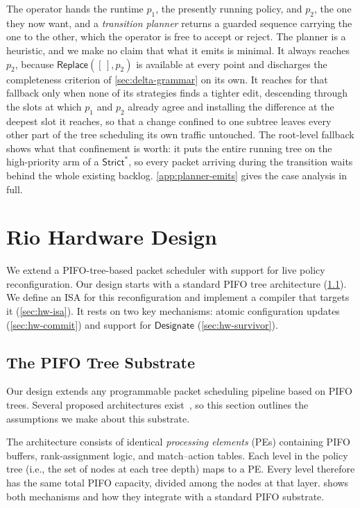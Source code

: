 \documentclass[sigplan,anonymous,review,nonacm]{acmart}
\newcommand{\Strictstar}{\textsf{Strict}^{*}}
\newcommand{\Designate}{\textsf{Designate}}
\newcommand{\Replace}{\textsf{Replace}}
\begin{document}
The operator hands the runtime \(p_1\), the presently running policy, and \(p_2\), the one they now want, and a \emph{transition planner} returns a guarded sequence carrying the one to the other, which the operator is free to accept or reject.
The planner is a heuristic, and we make no claim that what it emits is minimal.
It always reaches \(p_2\), because \(\Replace([\,], p_2)\) is available at every point and discharges the completeness criterion of \cref{sec:delta-grammar} on its own.
It reaches for that fallback only when none of its strategies finds a tighter edit, descending through the slots at which \(p_1\) and \(p_2\) already agree and installing the difference at the deepest slot it reaches, so that a change confined to one subtree leaves every other part of the tree scheduling its own traffic untouched.
The root-level fallback shows what that confinement is worth: it puts the entire running tree on the high-priority arm of a \(\Strictstar\), so every packet arriving during the transition waits behind the whole existing backlog.
\cref{app:planner-emits} gives the case analysis in full.



\section{Rio Hardware Design}\label{sec:hardware}

We extend a PIFO-tree-based packet scheduler with support for live policy reconfiguration.
Our design starts with a standard PIFO tree architecture (\cref{sec:hw-substrate}).
We define an ISA for this reconfiguration and implement a compiler that targets it (\cref{sec:hw-isa}).
It rests on two key mechanisms:
atomic configuration updates (\cref{sec:hw-commit})
and support for $\Designate$ (\cref{sec:hw-survivor}).

\subsection{The PIFO Tree Substrate}\label{sec:hw-substrate}

Our design extends any programmable packet scheduling pipeline based on PIFO trees.
Several proposed architectures exist~\cite{Sivaraman16,Yao23,vPIFO},
so this section outlines the assumptions we make about this substrate.

The architecture consists of identical \emph{processing elements} (PEs) containing PIFO buffers, rank-assignment logic, and match--action tables.
Each level in the policy tree (i.e., the set of nodes at each tree depth) maps to a PE.
Every level therefore has the same total PIFO capacity, divided among the nodes at that layer.
 shows both mechanisms and how they integrate with a standard PIFO substrate.
\end{document}
